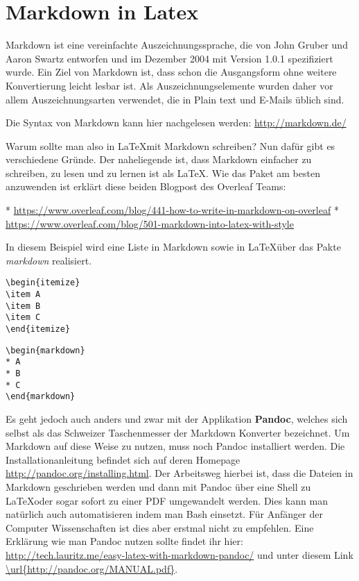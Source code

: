 \chapter{Markdown in Latex}

Markdown ist eine vereinfachte Auszeichnungssprache, die von John Gruber und Aaron Swartz entworfen und im Dezember 2004 mit Version 1.0.1 spezifiziert wurde. Ein Ziel von Markdown ist, dass schon die Ausgangsform ohne weitere Konvertierung leicht lesbar ist. Als Auszeichnungselemente wurden daher vor allem Auszeichnungsarten verwendet, die in Plain text und E-Mails üblich sind. \cite{WikiMarkdown,rfc7763}

Die Syntax von Markdown kann hier nachgelesen werden: \url{http://markdown.de/}

Warum sollte man also in \LaTeX mit Markdown schreiben? Nun dafür gibt es verschiedene Gründe. Der naheliegende ist, dass Markdown einfacher zu schreiben, zu lesen und zu lernen ist als \LaTeX.  Wie das Paket am besten anzuwenden ist erklärt diese beiden Blogpost des Overleaf Teams:

\begin{markdown}
 * \url{https://www.overleaf.com/blog/441-how-to-write-in-markdown-on-overleaf}
 * \url{https://www.overleaf.com/blog/501-markdown-into-latex-with-style} 
\end{markdown}

In diesem Beispiel wird eine Liste in Markdown sowie in \LaTeX über das Pakte \emph{markdown} realisiert.
\begin{lstlisting}[style=LaTeX]
\begin{itemize}
\item A
\item B
\item C
\end{itemize}
\end{lstlisting}

\begin{lstlisting}[style=LaTeX]
\begin{markdown}
* A
* B
* C
\end{markdown}
\end{lstlisting}


Es geht jedoch auch anders und zwar mit der Applikation \textbf{Pandoc}, welches sich selbst als das Schweizer Taschenmesser der Markdown Konverter bezeichnet. Um Markdown auf diese Weise zu nutzen, muss noch Pandoc installiert werden. Die Installationanleitung befindet sich auf deren Homepage \url{http://pandoc.org/installing.html}. Der Arbeitsweg hierbei ist, dass die Dateien in Markdown geschrieben werden und dann mit Pandoc über eine Shell zu \LaTeX oder sogar sofort zu einer PDF umgewandelt werden. Dies kann man natürlich auch automatisieren indem man Bash einsetzt. Für Anfänger der Computer Wissenschaften ist dies aber erstmal nicht zu empfehlen. Eine Erklärung wie man Pandoc nutzen sollte findet ihr hier: \url{http://tech.lauritz.me/easy-latex-with-markdown-pandoc/} und unter diesem Link \url{\url{http://pandoc.org/MANUAL.pdf}}.  

